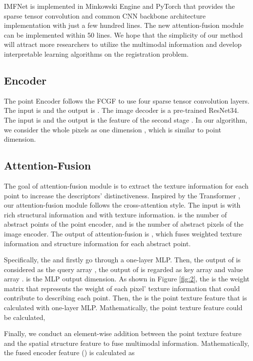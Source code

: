 \documentclass[10pt,twocolumn,letterpaper]{article}
\begin{document}
IMFNet is implemented in Minkowski Engine \cite{choy20194d} and PyTorch that provides the sparse tensor convolution and common CNN backbone architecture implementation with just a few hundred lines. The new attention-fusion module can be implemented within 50 lines.
We hope that the simplicity of our method will attract more researchers to utilize the multimodal information and develop interpretable learning algorithms on the registration problem.


\subsection{Encoder}
The point Encoder follows the FCGF \cite{choy2019fully} to use four sparse tensor convolution layers. The input is  and the output is . The image decoder is a pre-trained ResNet34. The input is  and the output is the feature of the second stage . In our algorithm, we consider the whole pixels as one dimension , which is similar to point dimension.

\subsection{Attention-Fusion}
The goal of attention-fusion module is to extract the texture information for each point to increase the descriptors' distinctiveness. Inspired by the Transformer \cite{vaswani2017attention}, our attention-fusion module follows the cross-attention style. The input is  with rich structural information and  with texture information.  is the number of abstract points of the point encoder, and  is the number of abstract pixels of the image encoder. The output of attention-fusion is  , which fuses weighted texture information and structure information for each abstract point.

Specifically, the  and  firstly go through a one-layer MLP. Then, the output of  is considered as the query array , the output of  is regarded as key array  and value array .  is the MLP output dimension. As shown in Figure \ref{fig:2}, the  is the weight matrix that represents the weight of each pixel' texture information that could contribute to describing each point. Then, the  is the point texture feature that is calculated with one-layer MLP. Mathematically, the point texture feature  could be calculated,  


Finally, we conduct an element-wise addition between the point texture feature  and the spatial structure feature  to fuse multimodal information. Mathematically, the fused encoder feature () is calculated as
\end{document}

